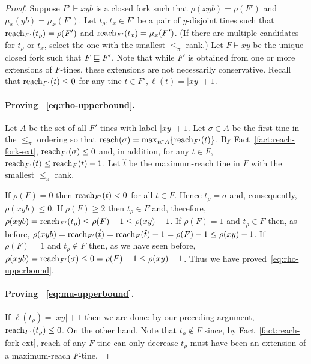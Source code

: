 \begin{proof}
  Suppose $F'\vdash xyb$ is a closed fork such that 
  $\rho(xyb)=\rho(F')$ and $\mu_x(yb)=\mu_x(F')$. 
  Let $t_\rho, t_x \in F'$ be a pair of $y$-disjoint tines such that $\operatorname{reach}_{F'}(t_\rho)=\rho(F')$ and $\operatorname{reach}_{F'}(t_x)=\mu_x(F')$. 
  (If there are multiple candidates for $t_\rho$ or $t_x$, 
  select the one with the smallest $\leq_\pi$ rank.)
  Let $F\vdash xy$ be the unique closed fork such that $F\sqsubseteq F'$.  
  Note that while $F'$ is obtained from one or more extensions 
  of $F$-tines, 
  these extensions are not necessarily conservative. 
  Recall that $\operatorname{reach}_{F'}(t) \leq 0$ for any tine $t \in F', \ell(t) = |xy| + 1$.

  \paragraph{Proving ~\eqref{eq:rho-upperbound}.} 
  Let $A$ be the set of all $F'$-tines with label $|xy| + 1$.
  Let $\sigma \in A$ be the first tine in the $\leq_\pi$ ordering so that $\operatorname{reach}(\sigma) = \max_{t \in A}\{\operatorname{reach}_{F'}(t)\}$.
  By Fact~\ref{fact:reach-fork-ext}, 
  $\operatorname{reach}_{F'}(\sigma) \leq 0$ and, 
  in addition, for any $t \in F$, 
  $\operatorname{reach}_{F'}(t) \leq \operatorname{reach}_F(t) - 1$.   
  Let $\hat{t}$ be the maximum-reach tine in $F$ 
  with the smallest $\leq_\pi$ rank.

  If $\rho(F) = 0$ then 
  $\operatorname{reach}_{F'}(t) < 0$ for all $t \in F$. 
  Hence $t_\rho = \sigma$ and, consequently, 
  $\rho(xyb) \leq 0$. 
  If $\rho(F) \geq 2$ then $t_\rho \in F$
  and, therefore, 
  $\rho(xyb) = \operatorname{reach}_{F'}(t_\rho) \leq \rho(F) - 1 \leq \rho(xy) - 1$. 
  If $\rho(F) = 1$ and $t_\rho \in F$ then, 
  as before, 
  $\rho(xyb) = \operatorname{reach}_{F'}(\hat{t}) = \operatorname{reach}_{F}(\hat{t}) - 1 = \rho(F) - 1 \leq \rho(xy) - 1$.
  If $\rho(F) = 1$ and $t_\rho \not \in F$ then, as we have seen before, 
  $\rho(xyb) = \operatorname{reach}_{F'}(\sigma) \leq 0 = \rho(F) - 1\leq \rho(xy) - 1$.
  Thus we have proved~\eqref{eq:rho-upperbound}.


  \paragraph{Proving ~\eqref{eq:mu-upperbound}.} 
  If $\ell(t_\rho) = |xy| + 1$ then we are done: 
  by our preceding argument, $\operatorname{reach}_{F'}(t_\rho) \leq 0$. 
  On the other hand, 
  Note that $t_\rho \not \in F$ since, by Fact~\ref{fact:reach-fork-ext}, reach of any $F$ tine can only decrease
  $t_\rho$ must have been an extension of a maximum-reach $F$-tine.


\end{proof}
